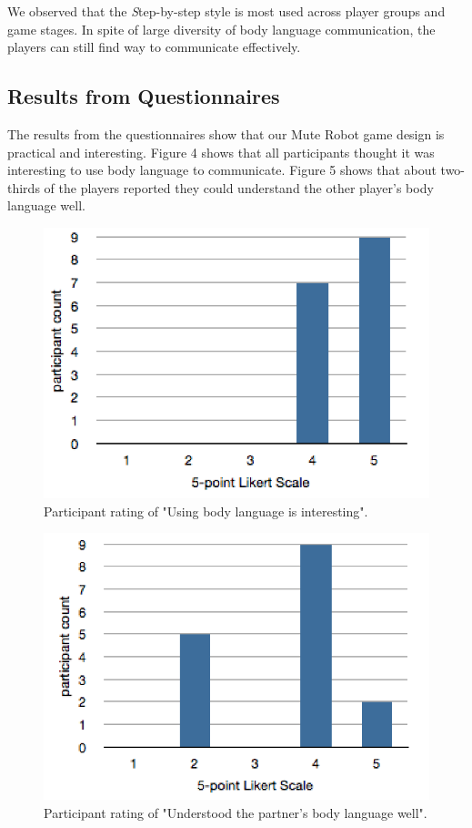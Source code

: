 \documentclass{chi-ext}
\begin{document}
We observed that the {\emph Step-by-step style} is most used across player groups and game stages. 
In spite of large diversity of body language communication, the players can still find way to communicate effectively.


%
\subsection{Results from Questionnaires}

The results from the questionnaires show that our Mute Robot game design is practical and interesting. 
Figure 4 shows that all participants thought it was interesting to use body language to communicate.
Figure 5 shows that about two-thirds of the players reported they could understand the other player's body language well.

\begin{figure}
  \centering
  \includegraphics[width=0.65\linewidth]{figures/1_BLisInteresting.png}
  \caption{Participant rating of "Using body language is interesting".}
  \label{fig:1_BLisInteresting}
\end{figure}


\begin{figure}
  \centering
  \includegraphics[width=0.65\linewidth]{figures/2_BLunderstand.png}
  \caption{Participant rating of "Understood the partner's body language well".}
  \label{fig:2_BLunderstand}
\end{figure}
\end{document}
